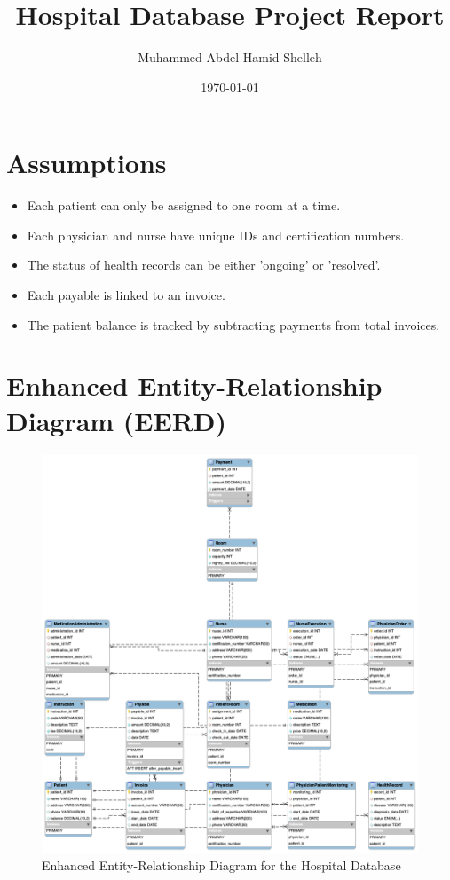 \documentclass{article}
\title{Hospital Database Project Report}
\author{Muhammed Abdel Hamid Shelleh}
\date{\today}
\begin{document}
\maketitle

\section{Assumptions}
\begin{itemize}
    \item Each patient can only be assigned to one room at a time.
    \item Each physician and nurse have unique IDs and certification numbers.
    \item The status of health records can be either 'ongoing' or 'resolved'.
    \item Each payable is linked to an invoice.
    \item The patient balance is tracked by subtracting payments from total invoices.
\end{itemize}

\section{Enhanced Entity-Relationship Diagram (EERD)}
\begin{figure}[H]
    \centering
    \includegraphics[width=1\textwidth]{hospital.png}
    \caption{Enhanced Entity-Relationship Diagram for the Hospital Database}
\end{figure}
\end{document}
